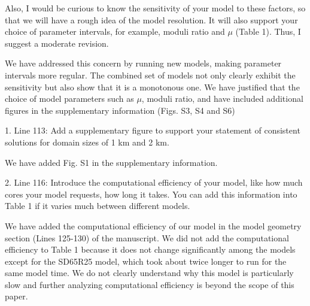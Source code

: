 \documentclass[12pt]{article}
\begin{document}
\begin{response}{Also, I would be curious to know the sensitivity of your model to these factors, so that we will have a rough idea of the model resolution. It will also support your choice of parameter intervals, for example, moduli ratio and $\mu$ (Table 1). Thus, I suggest a moderate revision.}

    We have addressed this concern by running new models, making parameter intervals more regular. The combined set of models not only clearly exhibit the sensitivity but also show that it is a monotonous one. We have justified that the choice of model parameters such as $\mu$, moduli ratio, and have included additional figures in the supplementary information (Figs. S3, S4 and S6) 
\end{response}



\begin{response}{1. Line 113: Add a supplementary figure to support your statement of consistent solutions for domain sizes of 1 km and 2 km.}
  
We have added Fig. S1 in the supplementary information. 
    
\end{response}

\begin{response}{2. Line 116: Introduce the computational efficiency of your model, like how much cores your model requests, how long it takes. You can add this information into Table 1 if it varies much between different models.}

  We have added the computational efficiency of our model in the model geometry section (Lines 125-130) of the manuscript. We did not add the computational efficiency to Table 1 because it does not change significantly among the models except for the SD65R25 model, which took about twice longer to run for the same model time. We do not clearly understand why this model is particularly slow and further analyzing computational efficiency is beyond the scope of this paper.
  
\end{response}
\end{document}
